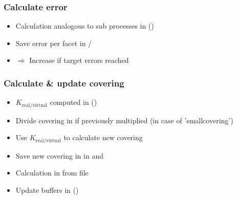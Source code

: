 \subsubsection{Calculate error}
\begin{itemize}[noitemsep,topsep=0pt, partopsep=0pt]
\item Calculation analogous to sub processes in  ()
\item Save error per facet in /
\item[]$\Rightarrow$ Increase  if target errors reached
\end{itemize}


\subsubsection{Calculate \& update covering}
\begin{itemize}[noitemsep,topsep=0pt, partopsep=0pt]
\item $K_{\text{real}/\text{virtual}}$ computed in  ()
\item Divide covering in   if previously multiplied (in case of 'smallcovering')
\item Use $K_{\text{real}/\text{virtual}}$ to calculate new covering
\item Save new covering in  in  and 
\item Calculation in  from  file
\item Update buffers in  ()
\end{itemize}

